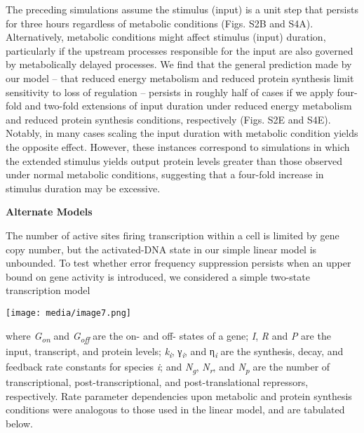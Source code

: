 The preceding simulations assume the stimulus (input) is a unit step that persists for three hours regardless of metabolic conditions (Figs. S2B and S4A). Alternatively, metabolic conditions might affect stimulus (input) duration, particularly if the upstream processes responsible for the input are also governed by metabolically delayed processes. We find that the general prediction made by our model -- that reduced energy metabolism and reduced protein synthesis limit sensitivity to loss of regulation -- persists in roughly half of cases if we apply four-fold and two-fold extensions of input duration under reduced energy metabolism and reduced protein synthesis conditions, respectively (Figs. S2E and S4E). Notably, in many cases scaling the input duration with metabolic condition yields the opposite effect. However, these instances correspond to simulations in which the extended stimulus yields output protein levels greater than those observed under normal metabolic conditions, suggesting that a four-fold increase in stimulus duration may be excessive.

\textbf{Alternate Models}

The number of active sites firing transcription within a cell is limited by gene copy number, but the activated-DNA state in our simple linear model is unbounded. To test whether error frequency suppression persists when an upper bound on gene activity is introduced, we considered a simple two-state transcription model

\texttt{[image: media/image7.png]}

where \emph{G\textsubscript{on}} and \emph{G\textsubscript{off}} are the on- and off- states of a gene; \emph{I}, \emph{R} and \emph{P} are the input, transcript, and protein levels; \emph{k\textsubscript{i}}, γ\emph{\textsubscript{i}}, and η\emph{\textsubscript{i}} are the synthesis, decay, and feedback rate constants for species \emph{i}; and \emph{N\textsubscript{g}}, \emph{N\textsubscript{r}}, and \emph{N\textsubscript{p}} are the number of transcriptional, post-transcriptional, and post-translational repressors, respectively. Rate parameter dependencies upon metabolic and protein synthesis conditions were analogous to those used in the linear model, and are tabulated below.

